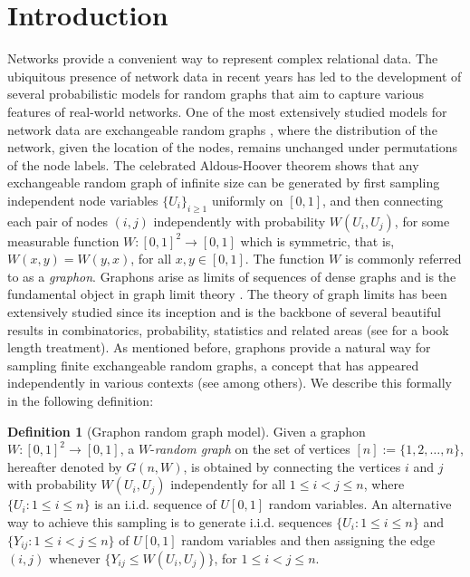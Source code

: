 \documentclass[11pt,reqno]{amsart}
\numberwithin{equation}{section}
\theoremstyle{definition}
\newtheorem{definition}{Definition}[section]
\begin{document}
\maketitle

\section{Introduction} 
Networks provide a convenient way to represent complex relational data. 
The ubiquitous presence of network data in recent years has led to the  development of several probabilistic models for random graphs that aim to capture  various features of real-world networks. 
One of the most extensively studied models for network data are exchangeable random graphs \cite{aldous1981representations,bickel2009nonparametric,bickel2011method,crane2018probabilistic,diaconisjanson,hoover1982row,lovasz2012large}, where the distribution of the network, given the location of the nodes, remains
unchanged under permutations of the node labels. The celebrated Aldous-Hoover theorem \cite{aldous1981representations,hoover1982row} shows that any exchangeable random graph of infinite size can be generated by first sampling independent node variables $\{U_i\}_{i \geq 1}$
uniformly on $[0, 1]$, and then connecting each pair of nodes $(i, j)$ independently with probability $W(U_i, U_j)$, for some measurable function $W: [0,1]^2\rightarrow[0,1]$ which is symmetric, that is, $W(x,y)=W(y,x)$, for all $x,y\in[0,1]$. 
The function $W$ is commonly referred to as a {\it graphon}. Graphons arise as limits of sequences of dense graphs and is the fundamental object in graph limit theory \cite{borgs2008convergent,borgs2012convergent,lovasz2012large}. 
The theory of graph limits has been extensively studied since its inception and is the backbone of several beautiful results in combinatorics, probability, statistics and related areas (see \cite{lovasz2012large} for a book length treatment). 
As mentioned before, graphons provide a natural way for sampling finite exchangeable random graphs, a concept that has appeared independently in various 
contexts (see \cite{bollobas2007phase,diaconis1981statistics,lovasz2006limits,boguna2003class,bickel2011method,hoff2002latent} among others). We describe this formally in the following definition: 

\begin{definition}[Graphon random graph model]\label{definition:W} Given a graphon $W:[0,1]^{2}\rightarrow[0,1]$, a $W$-{\it random graph} on the set of vertices $[n]:=\{1,2, \ldots, n\}$, hereafter denoted by $G(n, W)$, is obtained by connecting the vertices $i$ and $j$ with probability $W(U_{i},U_{j})$ independently for all $1 \leq i < j \leq n$, where $\{U_{i}: 1 \leq i \leq n\}$ is an i.i.d. sequence of $U[0,1]$ random variables. An alternative way to achieve this sampling is to generate i.i.d. sequences $\{U_{i}: 1 \leq i \leq n\}$ and $\{Y_{ij}: 1\leq i<j \leq n\}$ of $U[0,1]$ random variables and then assigning the edge $(i, j)$ whenever $\{Y_{ij}\leq W(U_{i},U_{j})\}$, for $1 \leq i < j \leq n$. 
\end{definition} 
\end{document}
